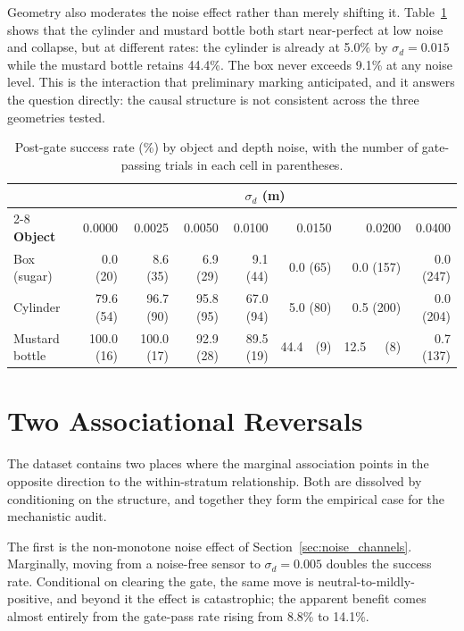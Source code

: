 \documentclass[11pt,a4paper]{report}
\begin{document}
Geometry also moderates the noise effect rather than merely shifting it. Table~\ref{tab:object_by_sigma} shows that the cylinder and mustard bottle both start near-perfect at low noise and collapse, but at different rates: the cylinder is already at 5.0\% by $\sigma_d = 0.015$ while the mustard bottle retains 44.4\%. The box never exceeds 9.1\% at any noise level. This is the interaction that preliminary marking anticipated, and it answers the question directly: the causal structure is not consistent across the three geometries tested.

\begin{table}[t]
  \caption{Post-gate success rate (\%) by object and depth noise, with the number of gate-passing trials in each cell in parentheses.}
  \label{tab:object_by_sigma}
  \centering
  \begin{tabular}{lrrrrrrr}
    \toprule
    & \multicolumn{7}{c}{$\sigma_d$ (m)} \\
    \cmidrule(lr){2-8}
    \textbf{Object} & 0.0000 & 0.0025 & 0.0050 & 0.0100 & 0.0150 & 0.0200 & 0.0400 \\
    \midrule
    Box (sugar)     &   0.0 (20) &   8.6 (35) &  6.9 (29) &  9.1 (44) &  0.0 (65) &  0.0 (157) & 0.0 (247) \\
    Cylinder        &  79.6 (54) &  96.7 (90) & 95.8 (95) & 67.0 (94) &  5.0 (80) &  0.5 (200) & 0.0 (204) \\
    Mustard bottle  & 100.0 (16) & 100.0 (17) & 92.9 (28) & 89.5 (19) & 44.4~~(9) & 12.5~~~(8) & 0.7 (137) \\
    \bottomrule
  \end{tabular}
\end{table}

\section{Two Associational Reversals}
\label{sec:reversals}

The dataset contains two places where the marginal association points in the opposite direction to the within-stratum relationship. Both are dissolved by conditioning on the structure, and together they form the empirical case for the mechanistic audit.

The first is the non-monotone noise effect of Section~\ref{sec:noise_channels}. Marginally, moving from a noise-free sensor to $\sigma_d = 0.005$ doubles the success rate. Conditional on clearing the gate, the same move is neutral-to-mildly-positive, and beyond it the effect is catastrophic; the apparent benefit comes almost entirely from the gate-pass rate rising from 8.8\% to 14.1\%.
\end{document}
